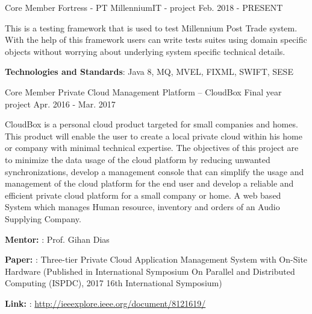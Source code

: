 

\begin{cventries}

  \cventry
    {Core Member} %
    {Fortress - PT} %
    {MillenniumIT - project} %
    {Feb. 2018 - PRESENT} %
    {
      \begin{cvitems} %
        \item {This is a testing framework that is used to test Millennium Post Trade system. With the help of this framework users can write tests suites using 		domain specific objects without worrying about underlying system specific technical details.}
        \item {\textbf{Technologies and Standards}: Java 8, MQ, MVEL, FIXML, SWIFT, SESE}
      \end{cvitems}
    }

  \cventry
    {Core Member} %
    {Private Cloud Management Platform – CloudBox } %
    {Final year project} %
    {Apr. 2016 - Mar. 2017} %
    {
      \begin{cvitems} %
        \item {CloudBox is a personal cloud product targeted for small companies and homes. This product will enable the user to create a local private cloud within his home or company with minimal technical expertise. The objectives of this project are to minimize the data usage of the cloud platform by reducing unwanted synchronizations, develop a management console that can simplify the usage and management of the cloud platform for the end user and develop a reliable and efficient private cloud platform for a small company or home. A web based System which manages Human resource, inventory and orders of an Audio Supplying Company.}
        \item {\textbf{Mentor: }:  Prof. Gihan Dias}
	\item {\textbf{Paper: }:   Three-tier Private Cloud Application Management System with On-Site Hardware (Published in International Symposium On 
Parallel and Distributed Computing (ISPDC), 2017 16th International Symposium)}
	\item {\textbf{Link:  }:  \url{http://ieeexplore.ieee.org/document/8121619/}}
      \end{cvitems}
    }


\end{cventries}
